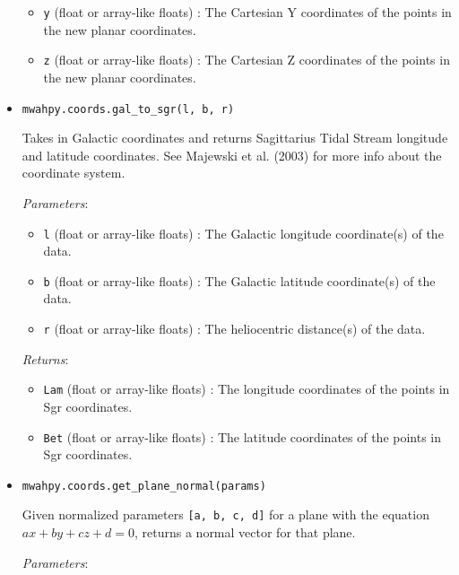 \documentclass{article}
\begin{document}
\begin{itemize}
\begin{itemize}
\item \verb!y! (float or array-like floats) : The Cartesian Y coordinates of the points in the new planar coordinates.

\item \verb!z! (float or array-like floats) : The Cartesian Z coordinates of the points in the new planar coordinates.

\end{itemize}



\item \verb!mwahpy.coords.gal_to_sgr(l, b, r)!

Takes in Galactic coordinates and returns Sagittarius Tidal Stream longitude and latitude coordinates. See Majewski et al. (2003) for more info about the coordinate system. 

\textit{Parameters}: \begin{itemize}

\item \verb!l! (float or array-like floats) : The Galactic longitude coordinate(s) of the data.

\item \verb!b! (float or array-like floats) : The Galactic latitude coordinate(s) of the data.

\item \verb!r! (float or array-like floats) : The heliocentric distance(s) of the data.

\end{itemize}

\textit{Returns}: \begin{itemize}

\item \verb!Lam! (float or array-like floats) : The longitude coordinates of the points in Sgr coordinates.

\item \verb!Bet! (float or array-like floats) : The latitude coordinates of the points in Sgr coordinates.

\end{itemize}



\item \verb!mwahpy.coords.get_plane_normal(params)!

Given normalized parameters \verb![a, b, c, d]! for a plane with the equation $ax + by + cz + d = 0$, returns a normal vector for that plane.

\textit{Parameters}: \begin{itemize}


\end{itemize}
\end{itemize}
\end{document}
